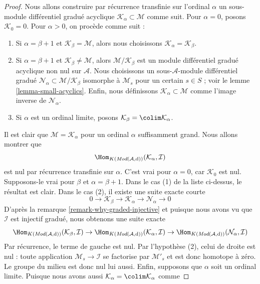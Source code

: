 \begin{proof}
\medskip\noindent
Nous allons construire par récurrence transfinie sur l'ordinal $\alpha$
un sous-module différentiel gradué acyclique
$\mathcal{K}_\alpha \subset \mathcal{M}$ comme suit.
Pour $\alpha = 0$, posons $\mathcal{K}_0 = 0$. Pour $\alpha > 0$,
on procède comme suit :
\begin{enumerate}
\item Si $\alpha = \beta + 1$ et $\mathcal{K}_\beta = \mathcal{M}$,
alors nous choisissons $\mathcal{K}_\alpha = \mathcal{K}_\beta$.
\item Si $\alpha = \beta + 1$ et $\mathcal{K}_\beta \not = \mathcal{M}$,
alors $\mathcal{M}/\mathcal{K}_\beta$ est un module différentiel gradué
acyclique non nul sur $\mathcal{A}$.
Nous choisissons un sous-$\mathcal{A}$-module différentiel gradué
$\mathcal{N}_\alpha \subset \mathcal{M}/\mathcal{K}_\beta$
isomorphe à $\mathcal{M}_s$ pour un certain $s \in S$ ; voir le
lemme \ref{lemma-small-acyclics}.
Enfin, nous définissons $\mathcal{K}_\alpha \subset \mathcal{M}$
comme l'image inverse de $\mathcal{N}_\alpha$.
\item Si $\alpha$ est un ordinal limite, posons
$\mathcal{K}_\beta = \colim \mathcal{K}_\alpha$.
\end{enumerate}
Il est clair que $\mathcal{M} = \mathcal{K}_\alpha$ pour un
ordinal $\alpha$ suffisamment grand. Nous allons montrer que
$$
\Hom_{K(\textit{Mod}(\mathcal{A}, \text{d}))}(\mathcal{K}_\alpha, \mathcal{I})
$$
est nul par récurrence transfinie sur $\alpha$. C'est vrai pour $\alpha = 0$,
car $\mathcal{K}_0$ est nul. Supposons-le vrai pour $\beta$ et
$\alpha = \beta + 1$. Dans le cas (1) de la liste ci-dessus, le résultat est clair.
Dans le cas (2), il existe une suite exacte courte
$$
0 \to \mathcal{K}_\beta \to \mathcal{K}_\alpha \to \mathcal{N}_\alpha \to 0
$$
D'après la remarque \ref{remark-why-graded-injective}
et puisque nous avons vu que $\mathcal{I}$ est injectif
gradué, nous obtenons une suite exacte
$$
\Hom_{K(\textit{Mod}(\mathcal{A}, \text{d}))}(\mathcal{K}_\beta, \mathcal{I})
\to
\Hom_{K(\textit{Mod}(\mathcal{A}, \text{d}))}(\mathcal{K}_\alpha, \mathcal{I})
\to
\Hom_{K(\textit{Mod}(\mathcal{A}, \text{d}))}(\mathcal{N}_\alpha, \mathcal{I})
$$
Par récurrence, le terme de gauche est nul. Par l'hypothèse (2),
celui de droite est nul : toute application $\mathcal{M}_s \to \mathcal{I}$
se factorise par $\mathcal{M}'_s$ et est donc homotope à zéro.
Le groupe du milieu est donc nul lui aussi. Enfin, supposons que $\alpha$ soit un
ordinal limite. Puisque nous avons aussi
$\mathcal{K}_\alpha = \colim \mathcal{K}_\alpha$ comme

\end{proof}
